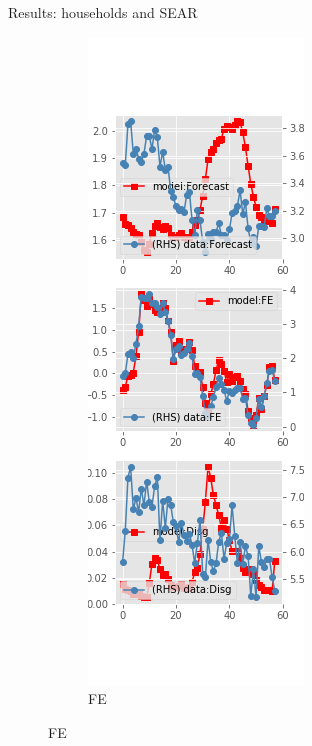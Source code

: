 \documentclass{beamer}
\begin{document}
\begin{frame}{Results: households and SEAR}
\begin{figure}[ht]
\begin{subfigure}[b]{0.19\textwidth}
	\end{subfigure}
	\hfill
	\begin{subfigure}[b]{0.19\textwidth}
		\caption{FE}
			\includegraphics[width=\textwidth, height = 0.8\textheight]{figuresDraft/sce_se_est_diag1.png}

\end{subfigure}
\end{figure}
\end{frame}
\end{document}
